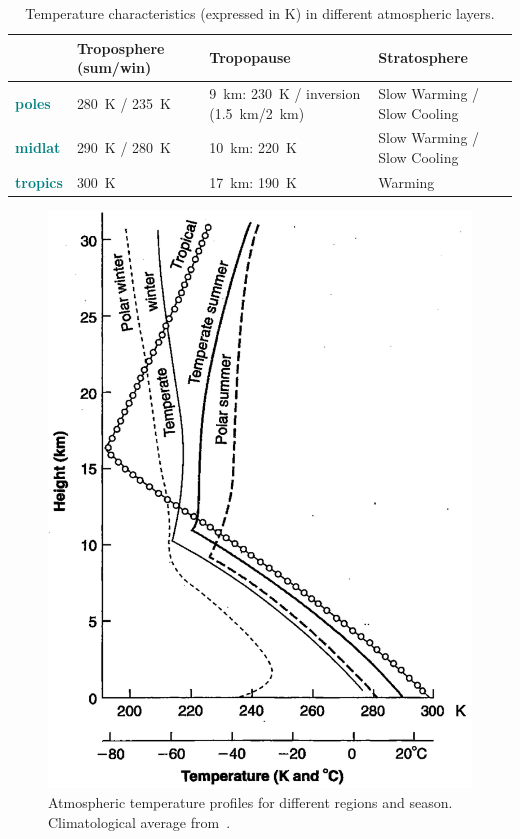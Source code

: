\begin{table}[h!]
	\centering
	\renewcommand{\arraystretch}{1.3} %
	\setlength{\tabcolsep}{4pt} %
	\begin{tabularx}{\textwidth}{@{}lXlX@{}}
		\toprule
		\textbf{}                          & \textbf{Troposphere (sum/win)}          & \textbf{Tropopause}                                                                                & \textbf{Stratosphere}       \\
		\midrule
		\textcolor{teal}{\textbf{poles}}   & \qty{280}{\kelvin} / \qty{235}{\kelvin} & \qty{9}{\kilo\meter}: \qty{230}{\kelvin} / inversion (\qty{1.5}{\kilo\meter}/\qty{2}{\kilo\meter}) & Slow Warming / Slow Cooling \\
		\textcolor{teal}{\textbf{midlat}}  & \qty{290}{\kelvin} / \qty{280}{\kelvin} & \qty{10}{\kilo\meter}: \qty{220}{\kelvin}                                                          & Slow Warming / Slow Cooling \\
		\textcolor{teal}{\textbf{tropics}} & \qty{300}{\kelvin}                      & \qty{17}{\kilo\meter}: \qty{190}{\kelvin}                                                          & Warming                     \\
		\bottomrule
	\end{tabularx}
	\caption{Temperature characteristics (expressed in \unit{\kelvin}) in different atmospheric layers.}
	\label{tab:atm-temps-layer-latitude}
\end{table}

\begin{figure}
	\centering
	\includegraphics[width = .5 \textwidth]{figs/temp-profile-dobson}
	\caption{Atmospheric temperature profiles for different regions and season. Climatological average from~\citet{Dobson1968}.}\label{fig:temp-profile-dobson}
\end{figure}

